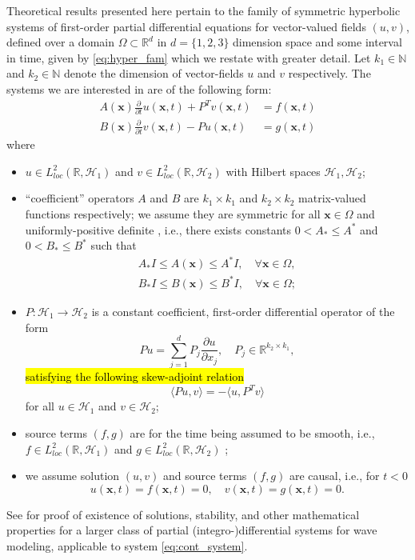 Theoretical results presented here pertain to the family of symmetric hyperbolic
systems of  first-order partial differential equations for vector-valued fields $(u,v)$,
defined over a domain $\Omega\subset \mathbb R^d$ in $d=\{1,2,3\}$ dimension
space and some interval in time, given by \ref{eq:hyper_fam} which we restate 
with greater detail.
Let $k_1\in\mathbb N$ and $k_2\in\mathbb N$ denote the dimension of 
vector-fields $u$ and $v$ respectively. 
The systems we are interested in are of the following form:
\begin{equation}\label{eq:cont_system}
\begin{split}
	A(\mathbf x)\frac{\partial}{\partial t}u(\mathbf x,t) + P^T v(\mathbf x,t) 
		&= f(\mathbf x,t) \\
	B(\mathbf x)\frac{\partial}{\partial t}v(\mathbf x,t) - Pu(\mathbf x,t) 
		&= g(\mathbf x,t)
\end{split}
\end{equation}
where
\begin{itemize}
	\item $u\in L^2_{loc}(\mathbb R,\mathcal H_1)$ and 
		$v\in L^2_{loc}(\mathbb R,\mathcal H_2)$ with Hilbert spaces 
		$\mathcal H_1, \mathcal H_2$;
	\item ``coefficient'' operators $A$ and $B$ are $k_1\times k_1$ 
		and $k_2\times k_2$ matrix-valued functions respectively; 
		we assume they are symmetric for all $\mathbf x\in\Omega$ 
		and uniformly-positive definite , i.e., there exists constants 
		$0< A_*\le A^*$ and $0< B_*\le B^*$ such that 
	\begin{equation}
	\begin{split}
		A_*I \le A(\mathbf x) \le A^*I, \quad \forall \mathbf x\in\Omega,\\
		B_*I \le B(\mathbf x) \le B^*I, \quad \forall \mathbf x\in\Omega;
	\end{split}
	\end{equation}
	
	\item $P:\mathcal H_1 \to \mathcal H_2$ is a constant coefficient, 
		first-order differential operator of the form
		\[
			Pu = \sum_{j=1}^d P_j \frac{\partial u}{\partial x_j}, \quad P_j\in \mathbb R^{k_2\times k_1},
		\]
		\hl{satisfying the following skew-adjoint relation}
		\begin{equation}\label{eq:skew}
			\langle P u, v \rangle = - \langle u, P^T v\rangle
		\end{equation}
		for all $u\in \mathcal H_1$ and $v\in\mathcal H_2$;
	\item source terms $(f,g)$ are for the time being assumed to be smooth, i.e., 
		 $f\in L^2_{loc}(\mathbb R,\mathcal H_1)$ 
		and $g\in L^2_{loc}(\mathbb R,\mathcal H_2)$ ;
	\item we assume solution $(u,v)$ and source terms $(f,g)$ are causal, i.e., for $t < 0$
		\[
			u(\mathbf x,t) = f(\mathbf x,t) = 0, \quad 
			v(\mathbf x,t) = g(\mathbf x,t) = 0.
		\]
\end{itemize}
See \cite{BlazekStolkSymes:13} for proof of existence of solutions, stability, and other mathematical properties for a larger class of partial (integro-)differential systems for wave modeling, applicable to system \ref{eq:cont_system}.

